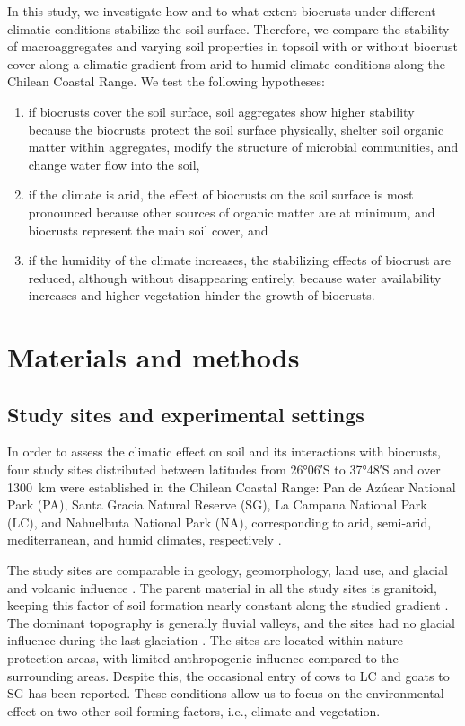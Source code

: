 In this study, we investigate how and to what extent biocrusts under different climatic conditions stabilize the soil surface. Therefore, we compare the stability of macroaggregates and varying soil properties in topsoil with or without biocrust cover along a climatic gradient from arid to humid climate conditions along the Chilean Coastal Range. We test the following hypotheses:

\begin{enumerate}[label=(\roman*)] %
    \item if biocrusts cover the soil surface, soil aggregates show higher stability because the biocrusts protect the soil surface physically, shelter soil organic matter within aggregates, modify the structure of microbial communities, and change water flow into the soil,

    \item if the climate is arid, the effect of biocrusts on the soil surface is most pronounced because other sources of organic matter are at minimum, and biocrusts represent the main soil cover, and

    \item if the humidity of the climate increases, the stabilizing effects of biocrust are reduced, although without disappearing entirely, because water availability increases and higher vegetation hinder the growth of biocrusts.
\end{enumerate}

\section{Materials and methods}
\subsection{Study sites and experimental settings}

In order to assess the climatic effect on soil and its interactions with biocrusts, four study sites distributed between latitudes from \ang{26;06}S to \ang{37;48}S and over \SI{1300}{\kilo\meter} were established in the Chilean Coastal Range: Pan de Azúcar National Park (PA), Santa Gracia Natural Reserve (SG), La Campana National Park (LC), and Nahuelbuta National Park (NA), corresponding to arid, semi-arid, mediterranean, and humid climates, respectively \citep{Bernhard2018}.

The study sites are comparable in geology, geomorphology, land use, and glacial and volcanic influence \citep{Bernhard2018}. The parent material in all the study sites is granitoid, keeping this factor of soil formation nearly constant along the studied gradient \citep{Oeser2018}. The dominant topography is generally fluvial valleys, and the sites had no glacial influence during the last glaciation \citep{Hulton2002}. The sites are located within nature protection areas, with limited anthropogenic influence compared to the surrounding areas. Despite this, the occasional entry of cows to LC \citep{Rundel1975} and goats to SG \citep{Armesto2007} has been reported. These conditions allow us to focus on the environmental effect on two other soil-forming factors, i.e., climate and vegetation.

